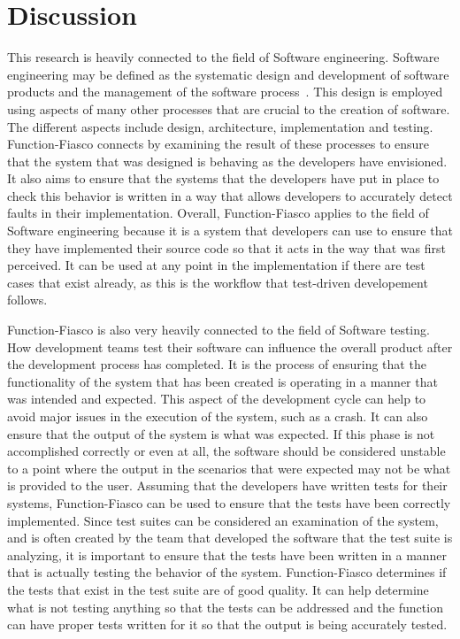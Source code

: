 \section{Discussion}
This research is heavily connected to the field of Software engineering. Software engineering may be defined as the systematic design and development of software products and the management of the software process~\cite{IEEE}. This design is employed using aspects of many other processes that are crucial to the creation of software. The different aspects include design, architecture, implementation and testing. Function-Fiasco connects by examining the result of these processes to ensure that the system that was designed is behaving as the developers have envisioned. It also aims to ensure that the systems that the developers have put in place to check this behavior is written in a way that allows developers to accurately detect faults in their implementation. Overall, Function-Fiasco applies to the field of Software engineering because it is a system that developers can use to ensure that they have implemented their source code so that it acts in the way that was first perceived. It can be used at any point in the implementation if there are test cases that exist already, as this is the workflow that test-driven developement follows.

Function-Fiasco is also very heavily connected to the field of Software testing. How development teams test their software can influence the overall product after the development process has completed. It is the process of ensuring that the functionality of the system that has been created is operating in a manner that was intended and expected. This aspect of the development cycle can help to avoid major issues in the execution of the system, such as a crash. It can also ensure that the output of the system is what was expected. If this phase is not accomplished correctly or even at all, the software should be considered unstable to a point where the output in the scenarios that were expected may not be what is provided to the user. Assuming that the developers have written tests for their systems, Function-Fiasco can be used to ensure that the tests have been correctly implemented. Since test suites can be considered an examination of the system, and is often created by the team that developed the software that the test suite is analyzing, it is important to ensure that the tests have been written in a manner that is actually testing the behavior of the system. Function-Fiasco determines if the tests that exist in the test suite are of good quality. It can help determine what is not testing anything so that the tests can be addressed and the function can have proper tests written for it so that the output is being accurately tested.

